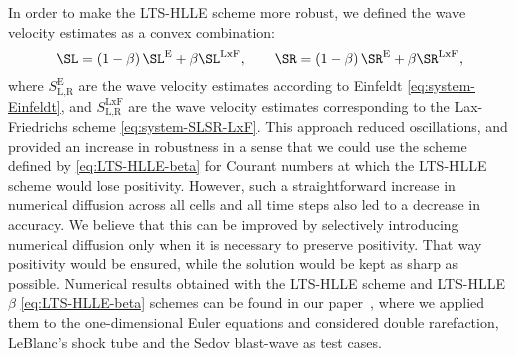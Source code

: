 In order to make the LTS-HLLE scheme more robust, we defined the wave velocity estimates as a convex combination:
\begin{equation} \label{eq:LTS-HLLE-beta}
\SL = \left( 1 - \beta \right) \SL^\text{E} + \beta \SL^\text{LxF}, \qquad
\SR = \left( 1 - \beta \right) \SR^\text{E} + \beta \SR^\text{LxF},
\end{equation}
where $ S_\text{L,R}^\text{E} $ are the wave velocity estimates according to Einfeldt \eqref{eq:system-Einfeldt}, and $ S_\text{L,R}^\text{LxF} $ are the wave velocity estimates corresponding to the Lax-Friedrichs scheme \eqref{eq:system-SLSR-LxF}. This approach reduced oscillations, and provided an increase in robustness in a sense that we could use the scheme defined by \eqref{eq:LTS-HLLE-beta} for Courant numbers at which the LTS-HLLE scheme would lose positivity. However, such a straightforward increase in numerical diffusion across all cells and all time steps also led to a decrease in accuracy. We believe that this can be improved by selectively introducing numerical diffusion only when it is necessary to preserve positivity. That way positivity would be ensured, while the solution would be kept as sharp as possible. Numerical results obtained with the LTS-HLLE scheme and LTS-HLLE$ \beta $ \eqref{eq:LTS-HLLE-beta} schemes can be found in our paper~\cite{jp3}, where we applied them to the one-dimensional Euler equations and considered double rarefaction, LeBlanc's shock tube and the Sedov blast-wave as test cases.

